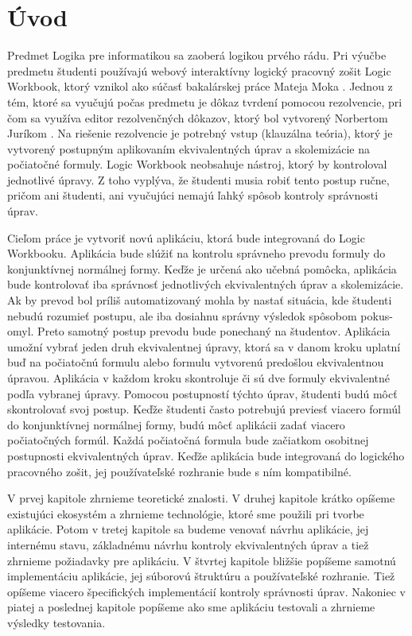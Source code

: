 \chapter*{Úvod} %

Predmet Logika pre informatikou sa zaoberá logikou prvého rádu. Pri výučbe predmetu študenti používajú webový interaktívny logický pracovný zošit Logic Workbook, ktorý vznikol ako súčasť bakalárskej práce Mateja Moka \cite{logicworkbook}. Jednou z tém, ktoré sa vyučujú počas predmetu je dôkaz tvrdení pomocou rezolvencie, pri čom sa využíva editor rezolvenčných dôkazov, ktorý bol vytvorený Norbertom Juríkom \cite{rezolvovac}. Na riešenie rezolvencie je potrebný vstup (klauzálna teória), ktorý je vytvorený postupným aplikovaním ekvivalentných úprav a skolemizácie na počiatočné formuly. Logic Workbook neobsahuje nástroj, ktorý by kontroloval jednotlivé úpravy. Z toho vyplýva, že študenti musia robiť tento postup ručne, pričom ani študenti, ani vyučujúci nemajú ľahký spôsob kontroly správnosti úprav.

Cieľom práce je vytvoriť novú aplikáciu, ktorá bude integrovaná do Logic Workbooku. Aplikácia bude slúžiť na kontrolu správneho prevodu formuly do konjunktívnej normálnej formy. Keďže je určená ako učebná pomôcka, aplikácia bude kontrolovať iba správnosť jednotlivých ekvivalentných úprav a skolemizácie. Ak by prevod bol príliš automatizovaný mohla by nastať situácia, kde študenti nebudú rozumieť postupu, ale iba dosiahnu správny výsledok spôsobom pokus-omyl. Preto samotný postup prevodu bude ponechaný na študentov. Aplikácia umožní vybrať jeden druh ekvivalentnej úpravy, ktorá sa v danom kroku uplatní buď na počiatočnú formulu alebo formulu vytvorenú predošlou ekvivalentnou úpravou. Aplikácia v každom kroku skontroluje či sú dve formuly ekvivalentné podľa vybranej úpravy. Pomocou postupností týchto úprav, študenti budú môcť skontrolovať svoj postup. Keďže študenti často potrebujú previesť viacero formúl do konjunktívnej normálnej formy, budú môcť aplikácii zadať viacero počiatočných formúl. Každá počiatočná formula bude začiatkom osobitnej postupnosti ekvivalentných úprav. Keďže aplikácia bude integrovaná do logického pracovného zošit, jej používateľské rozhranie bude s ním kompatibilné.

V prvej kapitole zhrnieme teoretické znalosti.
V druhej kapitole krátko opíšeme existujúci ekosystém a zhrnieme technológie, ktoré sme použili pri tvorbe aplikácie.
Potom v tretej kapitole sa budeme venovať návrhu aplikácie, jej internému stavu, základnému návrhu kontroly ekvivalentných úprav a tiež zhrnieme požiadavky pre aplikáciu.
V štvrtej kapitole bližšie popíšeme samotnú implementáciu aplikácie, jej súborovú štruktúru a používateľské rozhranie. Tiež opíšeme viacero špecifických implementácií kontroly správnosti úprav. 
Nakoniec v piatej a poslednej kapitole popíšeme ako sme aplikáciu testovali a zhrnieme výsledky testovania.
